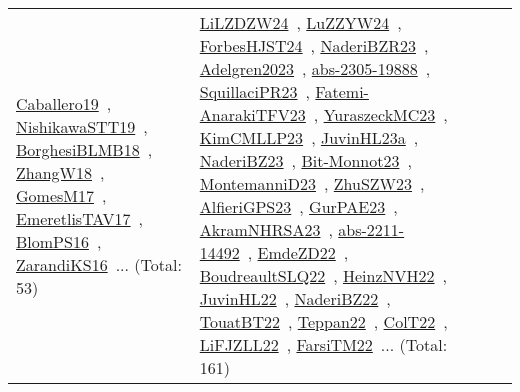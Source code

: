 {\begin{longtable}{lp{3cm}>{\raggedright\arraybackslash}p{6cm}>{\raggedright\arraybackslash}p{6cm}>{\raggedright\arraybackslash}p{8cm}}
\href{../works/Caballero19.pdf}{Caballero19}~\cite{Caballero19}, \href{../works/NishikawaSTT19.pdf}{NishikawaSTT19}~\cite{NishikawaSTT19}, \href{../works/BorghesiBLMB18.pdf}{BorghesiBLMB18}~\cite{BorghesiBLMB18}, \href{../works/ZhangW18.pdf}{ZhangW18}~\cite{ZhangW18}, \href{../works/GomesM17.pdf}{GomesM17}~\cite{GomesM17}, \href{../works/EmeretlisTAV17.pdf}{EmeretlisTAV17}~\cite{EmeretlisTAV17}, \href{../works/BlomPS16.pdf}{BlomPS16}~\cite{BlomPS16}, \href{../works/ZarandiKS16.pdf}{ZarandiKS16}~\cite{ZarandiKS16}... (Total: 53) & \href{../works/LiLZDZW24.pdf}{LiLZDZW24}~\cite{LiLZDZW24}, \href{../works/LuZZYW24.pdf}{LuZZYW24}~\cite{LuZZYW24}, \href{../works/ForbesHJST24.pdf}{ForbesHJST24}~\cite{ForbesHJST24}, \href{../works/NaderiBZR23.pdf}{NaderiBZR23}~\cite{NaderiBZR23}, \href{../works/Adelgren2023.pdf}{Adelgren2023}~\cite{Adelgren2023}, \href{../works/abs-2305-19888.pdf}{abs-2305-19888}~\cite{abs-2305-19888}, \href{../works/SquillaciPR23.pdf}{SquillaciPR23}~\cite{SquillaciPR23}, \href{../works/Fatemi-AnarakiTFV23.pdf}{Fatemi-AnarakiTFV23}~\cite{Fatemi-AnarakiTFV23}, \href{../works/YuraszeckMC23.pdf}{YuraszeckMC23}~\cite{YuraszeckMC23}, \href{../works/KimCMLLP23.pdf}{KimCMLLP23}~\cite{KimCMLLP23}, \href{../works/JuvinHL23a.pdf}{JuvinHL23a}~\cite{JuvinHL23a}, \href{../works/NaderiBZ23.pdf}{NaderiBZ23}~\cite{NaderiBZ23}, \href{../works/Bit-Monnot23.pdf}{Bit-Monnot23}~\cite{Bit-Monnot23}, \href{../works/MontemanniD23.pdf}{MontemanniD23}~\cite{MontemanniD23}, \href{../works/ZhuSZW23.pdf}{ZhuSZW23}~\cite{ZhuSZW23}, \href{../works/AlfieriGPS23.pdf}{AlfieriGPS23}~\cite{AlfieriGPS23}, \href{../works/GurPAE23.pdf}{GurPAE23}~\cite{GurPAE23}, \href{../works/AkramNHRSA23.pdf}{AkramNHRSA23}~\cite{AkramNHRSA23}, \href{../works/abs-2211-14492.pdf}{abs-2211-14492}~\cite{abs-2211-14492}, \href{../works/EmdeZD22.pdf}{EmdeZD22}~\cite{EmdeZD22}, \href{../works/BoudreaultSLQ22.pdf}{BoudreaultSLQ22}~\cite{BoudreaultSLQ22}, \href{../works/HeinzNVH22.pdf}{HeinzNVH22}~\cite{HeinzNVH22}, \href{../works/JuvinHL22.pdf}{JuvinHL22}~\cite{JuvinHL22}, \href{../works/NaderiBZ22.pdf}{NaderiBZ22}~\cite{NaderiBZ22}, \href{../works/TouatBT22.pdf}{TouatBT22}~\cite{TouatBT22}, \href{../works/Teppan22.pdf}{Teppan22}~\cite{Teppan22}, \href{../works/ColT22.pdf}{ColT22}~\cite{ColT22}, \href{../works/LiFJZLL22.pdf}{LiFJZLL22}~\cite{LiFJZLL22}, \href{../works/FarsiTM22.pdf}{FarsiTM22}~\cite{FarsiTM22}... (Total: 161)\\

\end{longtable}}
